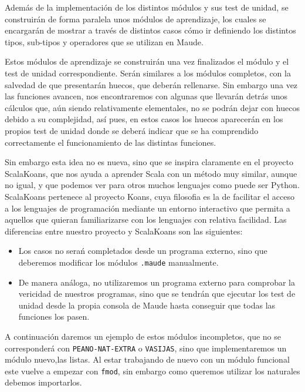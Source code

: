 Además de la implementación de los distintos módulos y sus test de unidad, se construirán de forma paralela unos módulos de aprendizaje, los cuales se encargarán de mostrar a través de distintos casos cómo ir definiendo los distintos tipos, sub-tipos y operadores que se utilizan en Maude.\par

Estos módulos de aprendizaje se construirán una vez finalizados el módulo y el test de unidad correspondiente. Serán similares a los módulos completos, con la salvedad de que presentarán huecos, que deberán rellenarse. Sin embargo una vez las funciones avancen, nos encontraremos con algunas que llevarán detrás unos cálculos que, aún siendo relativamente elementales, no se podrán dejar con huecos debido a su complejidad, así pues, en estos casos los huecos aparecerán en los propios test de unidad donde se deberá indicar que se ha comprendido correctamente el funcionamiento de las distintas funciones. \par

Sin embargo esta idea no es nueva, sino que se inspira claramente en el proyecto ScalaKoans, que nos ayuda a aprender Scala con un método muy similar, aunque no igual, y que podemos ver para otros muchos lenguajes como puede ser Python. ScalaKoans pertenece al proyecto Koans, cuya filosofia es la de facilitar el acceso a los lenguajes de programación mediante un entorno interactivo que permita a aquellos que quieran familiarizarse con los lenguajes con relativa facilidad. Las diferencias entre nuestro proyecto y ScalaKoans son las siguientes:\par
\begin{itemize}
\item Los casos no serań completados desde un programa externo, sino que deberemos modificar los módulos \texttt{.maude} manualmente.
\item De manera análoga, no utilizaremos un programa externo para comprobar la vericidad de nuestros programas, sino que se tendrán que ejecutar los test de unidad desde la propia consola de Maude hasta conseguir que todas las funciones los pasen.
\end{itemize}
 A continuación daremos un ejemplo de estos módulos incompletos, que no se corresponderá con \texttt{PEANO-NAT-EXTRA} o \texttt{VASIJAS}, sino que implementaremos un módulo nuevo,las listas. Al estar trabajando de nuevo con un módulo funcional este vuelve a empezar con \verb"fmod", sin embargo como queremos utilizar los naturales debemos importarlos. \par

